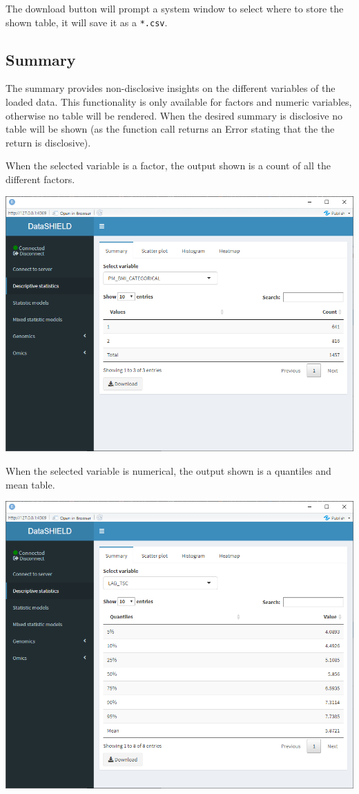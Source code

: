 \documentclass[
]{book}
\begin{document}
The download button will prompt a system window to select where to store the shown table, it will save it as a \texttt{*.csv}.

\hypertarget{summary}{%
\subsection{Summary}\label{summary}}

The summary provides non-disclosive insights on the different variables of the loaded data. This functionality is only available for factors and numeric variables, otherwise no table will be rendered. When the desired summary is disclosive no table will be shown (as the function call returns an Error stating that the the return is disclosive).

When the selected variable is a factor, the output shown is a count of all the different factors.

\includegraphics{images/descriptive_stats2.png}

When the selected variable is numerical, the output shown is a quantiles and mean table.

\includegraphics{images/descriptive_stats1.png}
\end{document}
